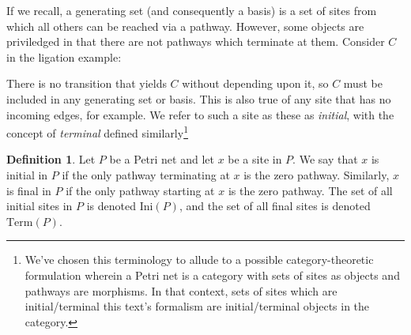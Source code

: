 \documentclass[aps,prd,onecolumn,nofootinbib,letterpaper,preprintnumbers,superscriptaddress,eqsecnum]{revtex4}
\theoremstyle{definition}
\newtheorem{definition}{Definition}
\newcommand{\Ini}[1]{\textrm{Ini}(#1)}
\newcommand{\Term}[1]{\textrm{Term}(#1)}
\begin{document}
If we recall, a generating set (and consequently a basis) is a set of sites from which all others can be reached via a pathway.
However, some objects are priviledged in that there are not pathways which terminate at them.
Consider $C$ in the ligation example:
\begin{center}
\end{center}
There is no transition that yields $C$ without depending upon it, so $C$ must be included in any generating set or basis.
This is also true of any site that has no incoming edges, for example.
We refer to such a site as these as \textit{initial}, with the concept of \textit{terminal} defined similarly\footnote{We've chosen this terminology to allude to a possible category-theoretic formulation wherein a Petri net is a category with sets of sites as objects and pathways are morphisms. In that context, sets of sites which are initial/terminal this text's formalism are initial/terminal objects in the category.}
\begin{definition}\label{def:initial-final}
    Let $P$ be a Petri net and let $x$ be a site in $P$.
    We say that $x$ is initial in $P$ if the only pathway terminating at $x$ is the zero pathway.
    Similarly, $x$ is final in $P$ if the only pathway starting at $x$ is the zero pathway.
    The set of all initial sites in $P$ is denoted $\Ini{P}$, and the set of all final sites is denoted $\Term{P}$.
\end{definition}
\end{document}
